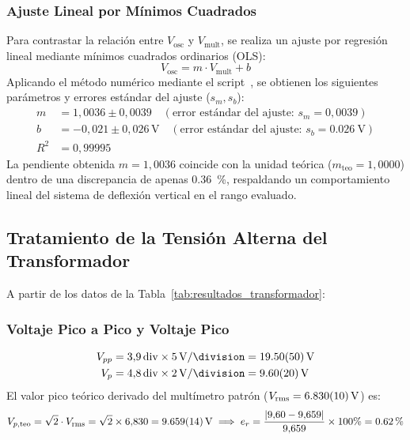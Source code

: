 \subsubsection{Ajuste Lineal por Mínimos Cuadrados}
Para contrastar la relación entre $V_{\text{osc}}$ y $V_{\text{mult}}$, se realiza un ajuste por regresión lineal mediante mínimos cuadrados ordinarios (OLS):
\begin{equation}
    V_{\text{osc}} = m \cdot V_{\text{mult}} + b
\end{equation}
Aplicando el método numérico mediante el script~\cite{scipy, script_graficas}, se obtienen los siguientes parámetros y errores estándar del ajuste ($s_m, s_b$):
\begin{align}
    m &= 1{,}0036 \pm 0{,}0039 \quad (\text{error estándar del ajuste: } s_m = 0{,}0039) \label{eq:pendiente_dc} \\
    b &= -0{,}021 \pm 0{,}026\,\unit{\volt} \quad (\text{error estándar del ajuste: } s_b = \qty{0,026}{\volt}) \label{eq:intercepto_dc} \\
    R^2 &= 0{,}99995 \label{eq:r2_dc}
\end{align}
La pendiente obtenida $m = 1{,}0036$ coincide con la unidad teórica ($m_{\text{teo}} = 1{,}0000$) dentro de una discrepancia de apenas \qty{0,36}{\percent}, respaldando un comportamiento lineal del sistema de deflexión vertical en el rango evaluado.

\subsection{Tratamiento de la Tensión Alterna del Transformador}
A partir de los datos de la Tabla~\ref{tab:resultados_transformador}:

\subsubsection{Voltaje Pico a Pico y Voltaje Pico}
\begin{align}
    V_{pp} &= 3{,}9\,\text{div} \times \qty{5}{\volt\per\division} = \qty{19,50 \pm 0,50}{\volt} \\
    V_p    &= 4{,}8\,\text{div} \times \qty{2}{\volt\per\division} = \qty{9,60 \pm 0,20}{\volt}
\end{align}
El valor pico teórico derivado del multímetro patrón ($V_{\text{rms}} = \qty{6,830 \pm 0,010}{\volt}$) es:
\begin{equation}
    V_{p,\text{teo}} = \sqrt{2} \cdot V_{\text{rms}} = \sqrt{2} \times 6{,}830 = \qty{9,659 \pm 0,014}{\volt} \implies e_r = \frac{|9{,}60 - 9{,}659|}{9{,}659} \times 100\% = \qty{0,62}{\percent}
\end{equation}

